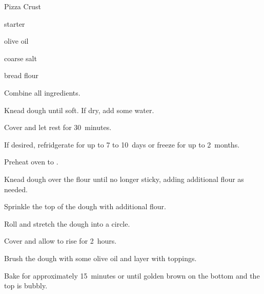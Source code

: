 \begin{recipe}{Pizza Crust}{}{}

\begin{ingredients}
\item \C{1\half} starter
\item {} olive oil
\item {} coarse salt
\item \C{1\half} bread flour
\end{ingredients}

\begin{directions}
\item Combine all ingredients.
\item Knead dough until soft. If dry, add some water.
\item Cover and let rest for 30~minutes.
\item If desired, refridgerate for up to 7 to 10~days or freeze for up to 2~months.
\item Preheat oven to .
\item Knead dough over the flour until no longer sticky, adding additional flour as needed.
\item Sprinkle the top of the dough with additional flour.
\item Roll and stretch the dough into a circle.
\item Cover and allow to rise for 2~hours.
\item Brush the dough with some olive oil and layer with toppings.
\item Bake for approximately 15~minutes or until golden brown on the bottom and the top is bubbly.
\end{directions}
\end{recipe}

